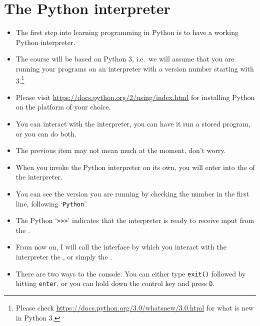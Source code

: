 \documentclass[a4paper]{article}
\begin{document}
\tableofcontents

\section{The Python interpreter}

\begin{itemize}
\item The first step into learning programming in Python is to have a working
Python interpreter.

\item The course will be based on Python 3, i.e.\ we will assume that you are
running your programs on an interpreter with a version number starting with
3.\footnote{Please check \url{https://docs.python.org/3.0/whatsnew/3.0.html}
for what is new in Python 3.}

\item Please visit \url{https://docs.python.org/2/using/index.html} for
installing Python on the platform of your choice.

\item You can interact with the interpreter, you can have it run a stored
program, or you can do both.

\item The previous item may not mean much at the moment, don't worry. 

\item When you invoke the Python interpreter on its own, you will enter into the
 of the interpreter.


\begin{ucodeframe}

\end{ucodeframe}

\item You can see the version you are running by checking the number in the
first line, following `\Verb+Python+'.
\item The Python  `\Verb+>>>+' indicates that the interpreter is ready
to receive input from the .   
\item From now on, I will call the interface by which you interact with the
interpreter the , or simply the .
\item There are two ways to  the console. You can either type
\Verb+exit()+ followed by hitting \Verb+enter+, or you can hold down the control key and
press \Verb+D+.


\end{itemize}
\end{document}
